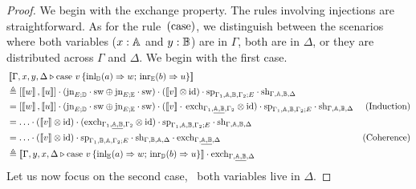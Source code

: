 \documentclass[10pt,a4paper]{amsart}
\theoremstyle{definition}
\theoremstyle{definition}
\theoremstyle{definition}
\theoremstyle{definition}
\theoremstyle{definition}
\theoremstyle{definition}
\begin{document}
\begin{proof}
  We begin with the exchange property. The rules involving injections are
  straightforward. As for the rule~$(\mathrm{case})$, we distinguish between
  the scenarios where both variables ($x : \mathbb{A}$ and $y : \mathbb{B}$) are in
  $\Gamma$, both are in $\Delta$, or they are distributed across $\Gamma$ and
  $\Delta$. We begin with the first case. 
  \begin{align*}
    & \sem{\Gamma,x, y, \Delta \vljud \text{case }  v\,  \{\text{inl}_{\typeD} (a) \Rightarrow w ;\, \text{inr}_{\typeE} (b) \Rightarrow u\}} \\ 
    &\triangleq   [\sem{w}  , \sem{u}] \comp (\text{jn}_{E;\typeD}
    \comp \sw \oplus \text{jn}_{E;\typeE } \comp \sw) 
    \comp (\sem{ v} \otimes \id)  
    \comp \text{sp}_{\Gamma_{1},\typeA, \typeB,\Gamma_{2};E} 
    \comp \text{sh}_{\Gamma,\typeA, \typeB,\Delta}
    & \\
    & =  [\sem{w},\sem{u}] \comp (\text{jn}_{E;\typeD}
    \comp \sw \oplus \text{jn}_{E;\typeE } \comp \sw) 
    \comp (\sem{v} \comp\, \text{exch}_{\Gamma_{1}, \underline{\typeA,\typeB},\Gamma_{2}} 
    \otimes \id) \comp \text{sp}_{\Gamma_{1},\typeA, \typeB,\Gamma_{2};E} 
    \comp \text{sh}_{\Gamma,\typeA, \typeB,\Delta}
    & \text{(Induction)}\\
    &  =  \dots  \comp (\sem{v} \otimes \id) 
          \comp (\text{exch}_{\Gamma_1, \underline{\typeA, \typeB}, \Gamma_2} \otimes \text{id}) \comp \text{sp}_{\Gamma_{1},\typeA,\typeB, \Gamma_{2};E} \comp  \text{sh}_{\Gamma,\typeA, \typeB,\Delta} & {}\\
    & = \dots \comp (\sem{v} \otimes \id) \comp \text{sp}_{\Gamma_{1},\typeB,\typeA, \Gamma_{2};E} 
          \comp \text{sh}_{\Gamma,\typeB, \typeA,\Delta}  
          \comp \text{exch}_{\Gamma,  \underline{\typeA,\typeB}, \Delta} 
    & {\text{(Coherence)}} \\
    & \triangleq \sem{\Gamma,y, x, \Delta \vljud \text{case } v\,  \{\text{inl}_{\typeE} (a) \Rightarrow w ;\, \text{inr}_{\typeD} (b) \Rightarrow u\}} 
    \comp \text{exch}_{\Gamma,  \underline{\typeA, \typeB}, \Delta}
  \end{align*}
Let us now focus on the second case, \ie\ both variables live in $\Delta$.
%
%

\end{proof}
\end{document}
